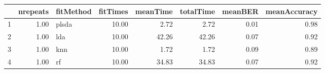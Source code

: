 \begin{table}[ht]
\centering
\begin{tabular}{rrlrrrrr}
  \hline
 & nrepeats & fitMethod & fitTimes & meanTime & totalTime & meanBER & meanAccuracy \\ 
  \hline
1 & 1.00 & plsda & 10.00 & 2.72 & 2.72 & 0.01 & 0.98 \\ 
  2 & 1.00 & lda & 10.00 & 42.26 & 42.26 & 0.07 & 0.92 \\ 
  3 & 1.00 & knn & 10.00 & 1.72 & 1.72 & 0.09 & 0.89 \\ 
  4 & 1.00 & rf & 10.00 & 34.83 & 34.83 & 0.07 & 0.92 \\ 
   \hline
\end{tabular}
\end{table}
